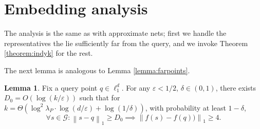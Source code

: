 \documentclass[10pt,a4paper,twoside]{book}
\newcommand{\eps}{\varepsilon}
\newcommand{\grid}{\mathcal{G}}
\newcommand{\norm}[1]{\left \rVert {#1} \right \rVert}
\theoremstyle{definition}
\newtheorem{lemma}[definition]{Lemma}
\theoremstyle{remark}
\begin{document}
\section*{Embedding analysis}
The analysis is the same as with approximate nets; first we handle the representatives the lie sufficiently far from the query, and we invoke Theorem \ref{theorem:indyk} for the rest.

The next lemma is analogous to Lemma \ref{lemma:farpoints}.
\begin{lemma} \label{lemma:farpointsgrid}
Fix a query point $q \in \ell_1^d$. For any $\eps < 1/2$, $\delta \in (0,1)$, there exists $D_0=O(\log (k/\eps))$ such that  for $k = \Theta \left( \log^{2}{\lambda_P} \cdot \log ( d / \eps) + \log (1/ \delta) \right)$, with probability at least $1 - \delta$,
\begin{equation*}
    \forall s \in \grid : \norm{s-q}_1 \geq D_0 \implies \norm{f(s)-f(q))}_1 \geq 4.
\end{equation*}
\end{lemma}
\end{document}
